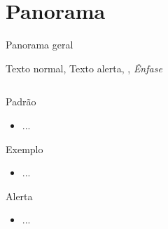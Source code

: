 \documentclass[table,xcolor=table]{apresentacoes/exemplo-2/IFMG-beamer}
\begin{document}
\section{Panorama}
\begin{frame}{Panorama geral}

Texto normal, \alert{Texto alerta},  , \emph{Ênfase}
\begin{columns}

\begin{column}{0.5\textwidth}

\begin{block}{Padrão}
  \begin{itemize}
  	\item ...
  \end{itemize}
\end{block}

\pause

\begin{exampleblock}{Exemplo}
  \begin{itemize}
  	\item ...
  \end{itemize}
\end{exampleblock}

\pause

\begin{alertblock}{Alerta}
  \begin{itemize}
  	\item ...
  \end{itemize}
\end{alertblock}

\end{column}


\pause
\begin{column}{0.5\textwidth}





\end{column}

\end{columns}
\end{frame}
\end{document}
